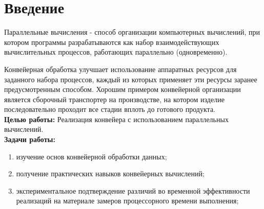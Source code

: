 \chapter*{Введение}


Параллельные вычисления - способ организации компьютерных вычислений,
при котором программы разрабатываются как набор взаимодействующих вычислительных процессов, работающих параллельно (одновременно).

Конвейерная обработка улучшает использование аппаратных ресурсов для заданного набора процессов, каждый из которых применяет эти ресурсы заранее предусмотренным способом. Хорошим примером конвейерной организации является сборочный транспортер на производстве, на котором изделие последовательно проходит все стадии вплоть до готового продукта.
\\


\textbf{Целью работы:} Реализация конвейера с использованием параллельных вычислений.
\\

\textbf{Задачи работы:}

\begin{enumerate}
    \setlength{\itemsep}{0em}
    \item изучение основ конвейерной обработки данных;
    \item получение практических навыков конвейерных вычислений;
    \item экспериментальное подтверждение различий во временной
    эффективности реализаций на материале замеров процессорного времени выполнения;
\end{enumerate}
